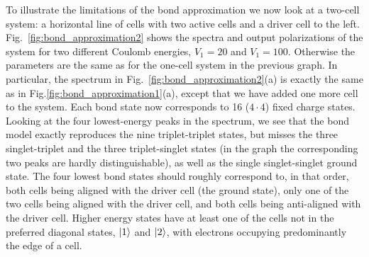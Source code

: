 To illustrate the limitations of the bond approximation we now look at a
two-cell system: a horizontal line of cells with two active cells and a driver
cell to the left. Fig.~\ref{fig:bond_approximation2} shows the spectra and
output polarizations of the system for two different Coulomb energies, $V_1 =
20$ and $V_1 = 100$. Otherwise the parameters are the same as for the one-cell
system in the previous graph. In particular, the spectrum in
Fig.~\ref{fig:bond_approximation2}(a) is exactly the same as in
Fig.\ref{fig:bond_approximation1}(a), except that we have added one more cell to
the system. Each bond state now corresponds to 16 ($4 \cdot 4$) fixed charge
states. Looking at the four lowest-energy peaks in the spectrum, we see that the
bond model exactly reproduces the nine triplet-triplet states, but misses the
three singlet-triplet and the three triplet-singlet states (in the graph the
corresponding two peaks are hardly distinguishable), as well as the single
singlet-singlet ground state. The four lowest bond states should roughly
correspond to, in that order, both cells being aligned with the driver cell (the
ground state), only one of the two cells being aligned with the driver cell, and
both cells being anti-aligned with the driver cell. Higher energy states have at
least one of the cells not in the preferred diagonal states, $\left|1\right>$ and
$\left|2\right>$, with electrons occupying predominantly the edge of a cell.

